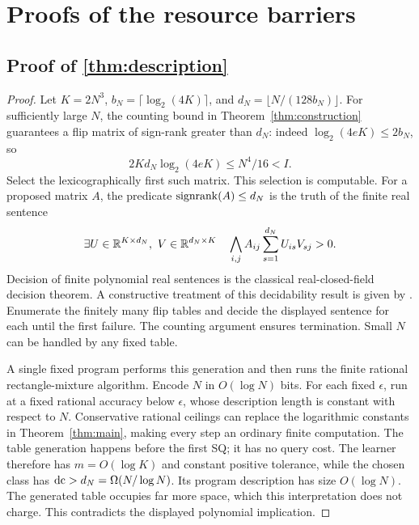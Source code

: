 \section{Proofs of the resource barriers}\label{app:barrier-proofs}
\subsection[Proof of result description]{Proof of \cref{thm:description}}\label{proof:description}
\begin{proof}
Let $K=2N^3$, $b_N=\lceil\log_2(4K)\rceil$, and $d_N=\lfloor N/(128b_N)\rfloor$. For sufficiently large $N$, the counting bound in Theorem~\ref{thm:construction} guarantees a flip matrix of sign-rank greater than $d_N$: indeed $\log_2(4eK)\le2b_N$, so
\[
 2Kd_N\log_2(4eK)\le N^4/16<I.
\]
Select the lexicographically first such matrix. This selection is computable. For a proposed matrix $A$, the predicate $\operatorname{signrank}(A)\le d_N$ is the truth of the finite real sentence
\[
 \exists U\in\mathbb R^{K\times d_N},\ V\in\mathbb R^{d_N\times K}\quad
 \bigwedge_{i,j} A_{ij}\sum_{s=1}^{d_N}U_{is}V_{sj}>0.
\]
Decision of finite polynomial real sentences is the classical real-closed-field decision theorem. A constructive treatment of this decidability result is given by \citet{MC12}. Enumerate the finitely many flip tables and decide the displayed sentence for each until the first failure. The counting argument ensures termination. Small $N$ can be handled by any fixed table.

A single fixed program performs this generation and then runs the finite rational rectangle-mixture algorithm. Encode $N$ in $O(\log N)$ bits. For each fixed $\epsilon$, run at a fixed rational accuracy below $\epsilon$, whose description length is constant with respect to $N$. Conservative rational ceilings can replace the logarithmic constants in Theorem~\ref{thm:main}, making every step an ordinary finite computation. The table generation happens before the first SQ; it has no query cost. The learner therefore has $m=O(\log K)$ and constant positive tolerance, while the chosen class has $\operatorname{dc}>d_N=\Omega(N/\log N)$. Its program description has size $O(\log N)$. The generated table occupies far more space, which this interpretation does not charge. This contradicts the displayed polynomial implication.
\end{proof}
